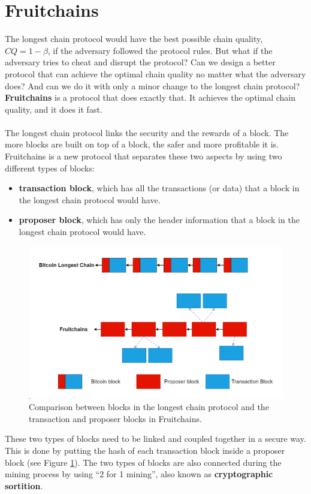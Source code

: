 \documentclass{report}
\begin{document}
\section{Fruitchains}
The longest chain protocol would have the best possible chain quality, $CQ = 1 - \beta$, if the adversary followed the protocol rules. But what if the adversary tries to cheat and disrupt the protocol? Can we design a better protocol that can achieve the optimal chain quality no matter what the adversary does? And can we do it with only a minor change to the longest chain protocol?\\ \textbf{Fruitchains} is a protocol that does exactly that. It achieves the optimal chain quality, and it does it fast.\\\\
The longest chain protocol links the security and the rewards of a block. The more blocks are built on top of a block, the safer and more profitable it is. Fruitchains is a new protocol that separates these two aspects by using two different types of blocks:
\begin{itemize}
	\item \textbf{transaction block}, which has all the transactions (or data) that a block in the longest chain protocol would have.
	\item \textbf{proposer block}, which has only the header information that a block in the longest chain protocol would have.
\end{itemize}
\begin{figure}[h!]
	\centering
	\includegraphics[width=0.7\linewidth]{Fig/F4}
	\caption{Comparison between blocks in the longest chain protocol and the transaction and proposer
		blocks in Fruitchains.}
	\label{fig:f4}
\end{figure}

These two types of blocks need to be linked and coupled together in a secure way. This is done by putting the hash of each transaction block inside a proposer block (see Figure \ref{fig:f4}). The two types of blocks are also connected during the mining process by using “2 for 1 mining”, also known as \textbf{cryptographic sortition}.
\end{document}
